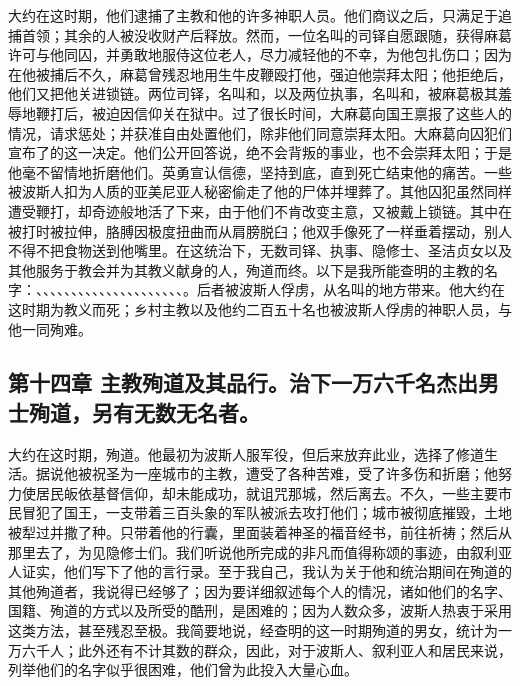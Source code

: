 大约在这时期，他们逮捕了主教和他的许多神职人员。他们商议之后，只满足于追捕首领；其余的人被没收财产后释放。然而，一位名叫的司铎自愿跟随，获得麻葛许可与他同囚，并勇敢地服侍这位老人，尽力减轻他的不幸，为他包扎伤口；因为在他被捕后不久，麻葛曾残忍地用生牛皮鞭殴打他，强迫他崇拜太阳；他拒绝后，他们又把他关进锁链。两位司铎，名叫和，以及两位执事，名叫和，被麻葛极其羞辱地鞭打后，被迫因信仰关在狱中。过了很长时间，大麻葛向国王禀报了这些人的情况，请求惩处；并获准自由处置他们，除非他们同意崇拜太阳。大麻葛向囚犯们宣布了的这一决定。他们公开回答说，绝不会背叛的事业，也不会崇拜太阳；于是他毫不留情地折磨他们。英勇宣认信德，坚持到底，直到死亡结束他的痛苦。一些被波斯人扣为人质的亚美尼亚人秘密偷走了他的尸体并埋葬了。其他囚犯虽然同样遭受鞭打，却奇迹般地活了下来，由于他们不肯改变主意，又被戴上锁链。其中在被打时被拉伸，胳膊因极度扭曲而从肩膀脱臼；他双手像死了一样垂着摆动，别人不得不把食物送到他嘴里。在这统治下，无数司铎、执事、隐修士、圣洁贞女以及其他服务于教会并为其教义献身的人，殉道而终。以下是我所能查明的主教的名字：、、、、、、、、、、、、、、、、、、、、、。后者被波斯人俘虏，从名叫的地方带来。他大约在这时期为教义而死；乡村主教以及他约二百五十名也被波斯人俘虏的神职人员，与他一同殉难。\par


\subsection{第十四章 主教殉道及其品行。治下一万六千名杰出男士殉道，另有无数无名者。}

大约在这时期，殉道。他最初为波斯人服军役，但后来放弃此业，选择了修道生活。据说他被祝圣为一座城市的主教，遭受了各种苦难，受了许多伤和折磨；他努力使居民皈依基督信仰，却未能成功，就诅咒那城，然后离去。不久，一些主要市民冒犯了国王，一支带着三百头象的军队被派去攻打他们；城市被彻底摧毁，土地被犁过并撒了种。只带着他的行囊，里面装着神圣的福音经书，前往祈祷；然后从那里去了，为见隐修士们。我们听说他所完成的非凡而值得称颂的事迹，由叙利亚人证实，他们写下了他的言行录。至于我自己，我认为关于他和统治期间在殉道的其他殉道者，我说得已经够了；因为要详细叙述每个人的情况，诸如他们的名字、国籍、殉道的方式以及所受的酷刑，是困难的；因为人数众多，波斯人热衷于采用这类方法，甚至残忍至极。我简要地说，经查明的这一时期殉道的男女，统计为一万六千人；此外还有不计其数的群众，因此，对于波斯人、叙利亚人和居民来说，列举他们的名字似乎很困难，他们曾为此投入大量心血。\par

